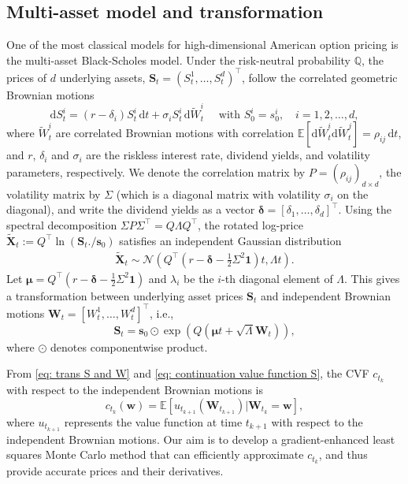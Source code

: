 \documentclass[10pt,a4paper]{amsart}
\numberwithin{equation}{section}
\numberwithin{algorithm}{section}
\theoremstyle{plain}
\theoremstyle{remark}
\renewcommand{\Tilde}[1]{\widetilde{#1}}
\begin{document}
\subsection{Multi-asset model and transformation} \label{sec:multi model}
One of the most classical models for high-dimensional American option pricing is the multi-asset Black-Scholes model. Under the risk-neutral probability $\mathbb{Q}$, the prices of $d$ underlying assets, $\mathbf{S}_t = \left(S^1_t, \dots, S^d_t \right)^\top$, follow the correlated geometric Brownian motions
\begin{equation} \label{eq: multi asset BS model}
    \mathrm{d}S^i_t = (r - \delta_i) S^i_t\,\mathrm{d}t + \sigma_i S^i_t\,\mathrm{d}\tilde{W}^i_t \quad \text{ with } S^i_0 = s^i_0, \quad i = 1,2,\dots,d,
\end{equation}
where $\tilde{W}^i_t$ are correlated Brownian motions with correlation $\mathbb{E}[\mathrm{d}\tilde{W}^i_t \mathrm{d}\tilde{W}^j_t] = \rho_{ij} \,\mathrm{d}t$, and $r$, $\delta_i$ and $\sigma_i$ are the riskless interest rate, dividend yields,
and volatility parameters, respectively. We
denote the correlation matrix by $P = (\rho_{ij})_{d\times d}$, the volatility matrix by $\Sigma$ (which is a diagonal matrix with
volatility $\sigma_i$ on the diagonal), and write the dividend yields as a vector $\bm{\delta} = [\delta_1, \dots, \delta_d]^\top$. Using the spectral decomposition $\Sigma P \Sigma^\top=Q\Lambda Q^\top$, the rotated log-price $\Tilde{\mathbf{X}}_t := Q^\top \ln(\mathbf{S}_t./\mathbf{s}_0)$ satisfies an independent Gaussian distribution
\begin{align*}
\Tilde{\mathbf{X}}_t\sim
\mathcal{N}\left(Q^\top \left(r - \bm{\delta} - \frac{1}{2}\Sigma^2\mathbf{1}\right)t, \Lambda t\right).
\end{align*}
Let $\bm{\mu} = Q^\top \left(r - \bm{\delta} - \frac{1}{2}\Sigma^2\mathbf{1}\right)$ and $\lambda_i$ be the $i$-th diagonal element of $\Lambda$. This gives a transformation between underlying asset prices $\mathbf{S}_t$ and independent Brownian motions $\mathbf{W}_t = [W^1_t, \dots, W^d_t]^\top$, i.e.,
\begin{equation} \label{eq: trans S and W}
    \mathbf{S}_t = \mathbf{s}_0 \odot \exp\left(Q \left(\bm{\mu}t + \sqrt{\Lambda} \mathbf{W}_t \right) \right),
\end{equation}
where $\odot$ denotes componentwise product.

From \cref{eq: trans S and W} and \cref{eq: continuation value function S}, the CVF $c_{t_k}$ with respect to the independent Brownian motions is
\begin{equation} \label{eq: continuation value W}
    c_{t_k}(\mathbf{w}) = \mathbb{E}[ u_{t_{k+1}}(\mathbf{W}_{t_{k+1}}) | \mathbf{W}_{t_k} = \mathbf{w}],
\end{equation}
where $u_{t_{k+1}}$ represents the value function at time $t_{k+1}$ with respect to the independent Brownian motions. Our aim is to develop a gradient-enhanced least squares Monte Carlo method that can efficiently approximate $c_{t_k}$, and thus provide accurate prices and their derivatives.
\end{document}
